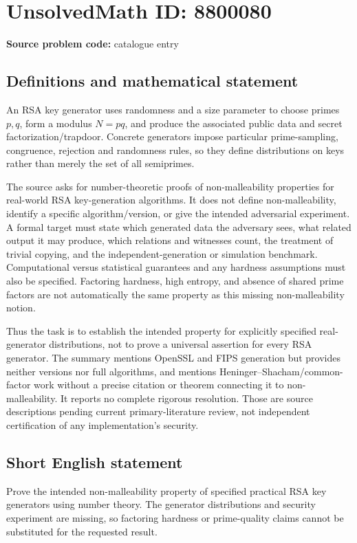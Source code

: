 \documentclass[11pt]{article}
\begin{document}
\section*{UnsolvedMath ID: 8800080}
\textbf{Source problem code:} catalogue entry
\subsection{Definitions and mathematical statement}
An RSA key generator uses randomness and a size parameter to choose primes \(p,q\), form a modulus \(N=pq\), and produce the associated public data and secret factorization/trapdoor. Concrete generators impose particular prime-sampling, congruence, rejection and randomness rules, so they define distributions on keys rather than merely the set of all semiprimes.

The source asks for number-theoretic proofs of non-malleability properties for real-world RSA key-generation algorithms. It does not define non-malleability, identify a specific algorithm/version, or give the intended adversarial experiment. A formal target must state which generated data the adversary sees, what related output it may produce, which relations and witnesses count, the treatment of trivial copying, and the independent-generation or simulation benchmark. Computational versus statistical guarantees and any hardness assumptions must also be specified. Factoring hardness, high entropy, and absence of shared prime factors are not automatically the same property as this missing non-malleability notion.

Thus the task is to establish the intended property for explicitly specified real-generator distributions, not to prove a universal assertion for every RSA generator. The summary mentions OpenSSL and FIPS generation but provides neither versions nor full algorithms, and mentions Heninger--Shacham/common-factor work without a precise citation or theorem connecting it to non-malleability. It reports no complete rigorous resolution. Those are source descriptions pending current primary-literature review, not independent certification of any implementation's security.
\subsection{Short English statement}
Prove the intended non-malleability property of specified practical RSA key generators using number theory. The generator distributions and security experiment are missing, so factoring hardness or prime-quality claims cannot be substituted for the requested result.
\end{document}
